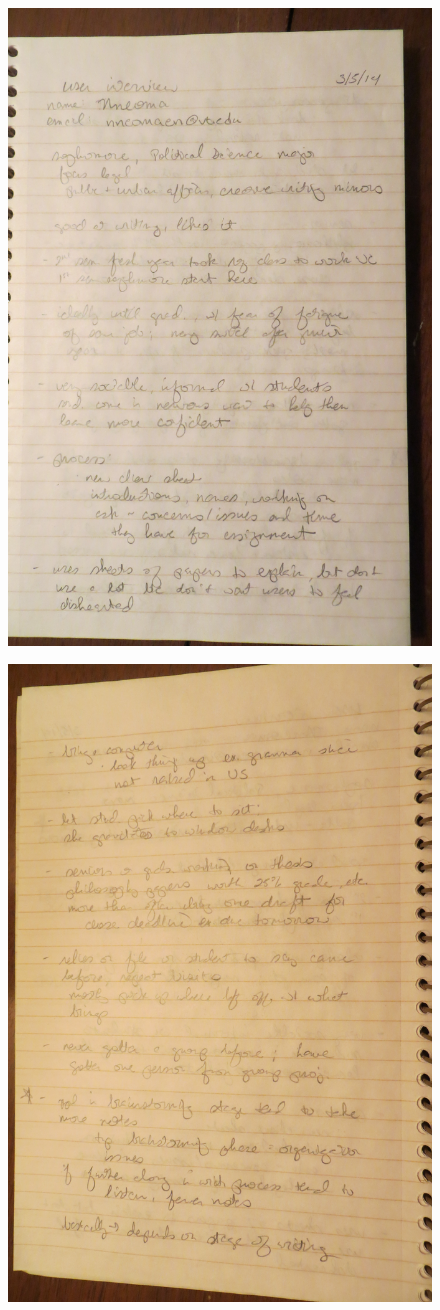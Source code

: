 \documentclass[12pt]{article} %
\begin{document}
  \begin{figure}[H]
  \centering
  \includegraphics[width=0.75\linewidth]{RAZ_raw_notes8}
  \caption{}
  \label{fig:rn8}
  \end{figure}
  \begin{figure}[H]
  \centering
  \includegraphics[width=0.75\linewidth]{RAZ_raw_notes9}
  \caption{}
  \label{fig:rn9}
  \end{figure}
\end{document}
